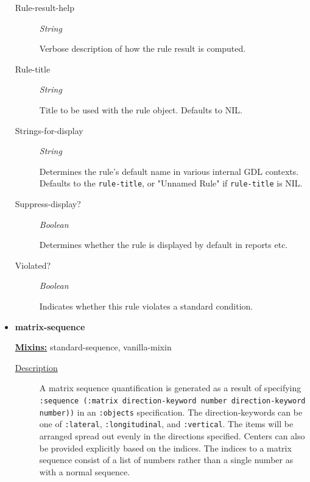 \documentclass [11pt]{book}
\begin{document}
\begin{itemize}
\begin{description}
\item [Rule-result-help]
\emph{String}

 Verbose description of how the rule result is computed.




\item [Rule-title]
\emph{String}

 Title to be used with the rule object. Defaults to NIL.




\item [Strings-for-display]
\emph{String}

 Determines the rule's default name in various internal GDL contexts. Defaults to
the \texttt{rule-title}, or "Unnamed Rule" if \texttt{rule-title} is NIL.




\item [Suppress-display?]
\emph{Boolean}

 Determines whether the rule is displayed by default in reports etc.




\item [Violated?]
\emph{Boolean}

 Indicates whether this rule violates a standard condition.




\end{description}







\item {}
\label{prim:matrix-sequence}
\textbf{matrix-sequence}


\textbf{
\underline{Mixins:}} standard-sequence, vanilla-mixin





\begin{description}

\item [
\underline{Description}]


A matrix sequence quantification is
generated as a result of specifying \texttt{:sequence (:matrix
direction-keyword number direction-keyword number))} in an
\texttt{:objects} specification. The direction-keywords can be one of
\texttt{:lateral}, \texttt{:longitudinal}, and \texttt{:vertical}. The
items will be arranged spread out evenly in the directions specified.
Centers can also be provided explicitly based on the indices.  The
indices to a matrix sequence consist of a list of numbers rather than
a single number as with a normal sequence.




\end{description}
\end{itemize}
\end{document}

